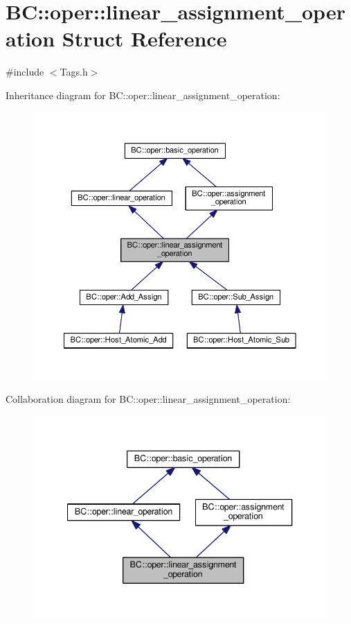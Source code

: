 \hypertarget{structBC_1_1oper_1_1linear__assignment__operation}{}\section{BC\+:\+:oper\+:\+:linear\+\_\+assignment\+\_\+operation Struct Reference}
\label{structBC_1_1oper_1_1linear__assignment__operation}


{\ttfamily \#include $<$Tags.\+h$>$}



Inheritance diagram for BC\+:\+:oper\+:\+:linear\+\_\+assignment\+\_\+operation\+:
\nopagebreak
\begin{figure}[H]
\begin{center}
\leavevmode
\includegraphics[width=350pt]{structBC_1_1oper_1_1linear__assignment__operation__inherit__graph}
\end{center}
\end{figure}


Collaboration diagram for BC\+:\+:oper\+:\+:linear\+\_\+assignment\+\_\+operation\+:
\nopagebreak
\begin{figure}[H]
\begin{center}
\leavevmode
\includegraphics[width=340pt]{structBC_1_1oper_1_1linear__assignment__operation__coll__graph}
\end{center}
\end{figure}


